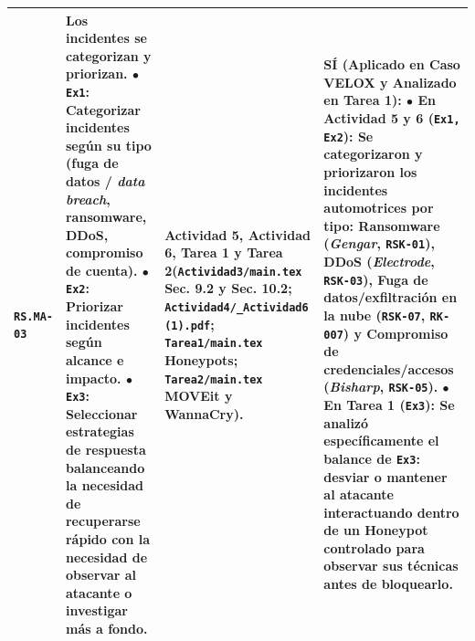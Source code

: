 \documentclass[letterpaper,11pt]{article}
\begin{document}
\begin{longtable}{|C{1.5cm}|L{5.3cm}|L{4.3cm}|L{5.8cm}|}
\texttt{RS.MA-03} &
\textbf{Los incidentes se categorizan y priorizan.}\newline
$\bullet$ \texttt{Ex1}: \textbf{Categorizar incidentes según su tipo (fuga de datos / \textit{data breach}, ransomware, DDoS, compromiso de cuenta)}.\newline
$\bullet$ \texttt{Ex2}: Priorizar incidentes según alcance e impacto.\newline
$\bullet$ \texttt{Ex3}: \textbf{Seleccionar estrategias de respuesta balanceando la necesidad de recuperarse rápido con la necesidad de observar al atacante o investigar más a fondo}. &
\textbf{Actividad 5, Actividad 6, Tarea 1 y Tarea 2}\newline (\texttt{Actividad3/main.tex} Sec. 9.2 y Sec. 10.2; \texttt{Actividad4/\_Actividad6 (1).pdf}; \texttt{Tarea1/main.tex} Honeypots; \texttt{Tarea2/main.tex} MOVEit y WannaCry). &
\textbf{SÍ (Aplicado en Caso VELOX y Analizado en Tarea 1):}\newline
$\bullet$ \textbf{En Actividad 5 y 6 (\texttt{Ex1, Ex2}):} Se categorizaron y priorizaron los incidentes automotrices por tipo: Ransomware (\textit{Gengar}, \texttt{RSK-01}), DDoS (\textit{Electrode}, \texttt{RSK-03}), Fuga de datos/exfiltración en la nube (\texttt{RSK-07}, \texttt{RK-007}) y Compromiso de credenciales/accesos (\textit{Bisharp}, \texttt{RSK-05}).\newline
$\bullet$ \textbf{En Tarea 1 (\texttt{Ex3}):} Se analizó específicamente el balance de \texttt{Ex3}: desviar o mantener al atacante interactuando dentro de un \textbf{Honeypot} controlado para observar sus técnicas antes de bloquearlo. \\
\hline


\end{longtable}
\end{document}
